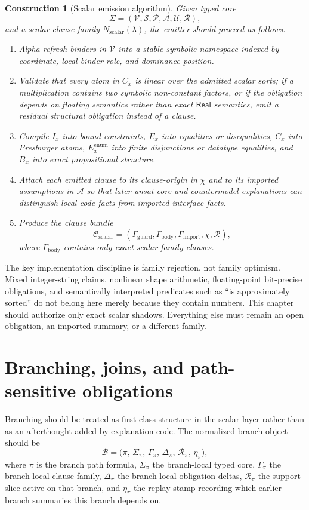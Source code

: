 \documentclass[11pt]{report}
\newtheorem{construction}[definition]{Construction}
\begin{document}
\begin{construction}[Scalar emission algorithm]
Given typed core
\[
\Sigma = (\mathcal{V}, \mathcal{S}, \mathcal{P}, \mathcal{A}, \mathcal{U}, \mathcal{R}),
\]
and a scalar clause family $N_{\mathrm{scalar}}(\lambda)$, the emitter should proceed as follows.
\begin{enumerate}
\item Alpha-refresh binders in $\mathcal{V}$ into a stable symbolic namespace indexed by coordinate, local binder role, and dominance position.
\item Validate that every atom in $C_x$ is linear over the admitted scalar sorts; if a multiplication contains two symbolic non-constant factors, or if the obligation depends on floating semantics rather than exact $\mathsf{Real}$ semantics, emit a residual structural obligation instead of a clause.
\item Compile $I_x$ into bound constraints, $E_x$ into equalities or disequalities, $C_x$ into Presburger atoms, $E_x^{\mathrm{enum}}$ into finite disjunctions or datatype equalities, and $B_x$ into exact propositional structure.
\item Attach each emitted clause to its clause-origin in $\chi$ and to its imported assumptions in $\mathcal{A}$ so that later unsat-core and countermodel explanations can distinguish local code facts from imported interface facts.
\item Produce the clause bundle
\[
\mathcal{C}_{\mathrm{scalar}}
=
(\Gamma_{\mathrm{guard}},\Gamma_{\mathrm{body}},\Gamma_{\mathrm{import}},\chi,\mathcal{R}),
\]
where $\Gamma_{\mathrm{body}}$ contains only exact scalar-family clauses.
\end{enumerate}
\end{construction}

The key implementation discipline is family rejection, not family optimism. Mixed integer-string claims, nonlinear shape arithmetic, floating-point bit-precise obligations, and semantically interpreted predicates such as ``is approximately sorted'' do not belong here merely because they contain numbers. This chapter should authorize only exact scalar shadows. Everything else must remain an open obligation, an imported summary, or a different family.
\section{Branching, joins, and path-sensitive obligations}
Branching should be treated as first-class structure in the scalar layer rather than as an afterthought added by explanation code. The normalized branch object should be
\[
\mathcal{B}
=
\bigl(
\pi,\,
\Sigma_{\pi},\,
\Gamma_{\pi},\,
\Delta_{\pi},\,
\mathcal{R}_{\pi},\,
\eta_{\pi}
\bigr),
\]
where $\pi$ is the branch path formula, $\Sigma_{\pi}$ the branch-local typed core, $\Gamma_{\pi}$ the branch-local clause family, $\Delta_{\pi}$ the branch-local obligation deltas, $\mathcal{R}_{\pi}$ the support slice active on that branch, and $\eta_{\pi}$ the replay stamp recording which earlier branch summaries this branch depends on.
\end{document}
